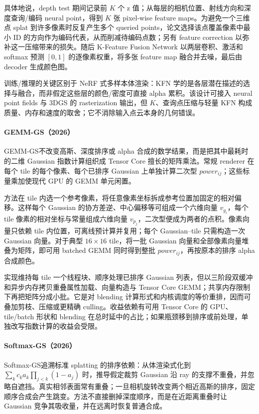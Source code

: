 具体地说，depth test 期间记录前 $K$ 个 z 值；从每层的相机位置、射线方向和深度查询/编码 neural point，得到 $K$ 张 pixel-wise feature maps。为避免一个三维点 splat 到许多像素时反复产生多个 queried points，论文选择该点覆盖像素中最小 ID 的方向作为编码代表，从而削减待编码点数；另有 feature correction 以弥补这一压缩带来的损失。随后 K-Feature Fusion Network 以两层卷积、激活和 softmax 预测 $[0,1]$ 的逐像素权重，将多张 feature map 融合并去噪，最后由 decoder 生成颜色图。

训练/推理的关键区别于 NeRF 式多样本体渲染：KFN 学的是各层潜在描述的选择与融合，而非假定这些层的颜色/密度可直接 alpha 累积。该设计可接入 neural point fields 与 3DGS 的 rasterization 输出，但 $K$、查询点压缩与轻量 KFN 构成质量、内存和速度的取舍；它不消除输入点云本身的几何错误。

\paragraph{GEMM-GS（2026）\cite{2604_02120}}
GEMM-GS不改变高斯、深度排序或 alpha 合成的数学结果，而是把其中最耗时的二维 Gaussian 指数计算组织成 Tensor Core 擅长的矩阵乘法。常规 renderer 在每个 tile 的每个像素、每个已排序 Gaussian 上单独计算二次型 $power_{ij}$；这些标量乘加使现代 GPU 的 GEMM 单元闲置。

方法在 tile 内选一个参考像素，将任意像素坐标拆成参考位置加固定的相对偏移。这样每个 Gaussian 的协方差逆、中心偏移等可组成一个六维向量 $v_{g_i}$，每个 tile 像素的相对坐标与常量组成六维向量 $v_{p_j}$，二次型便成为两者的点积。像素向量只依赖 tile 内位置，可离线预计算并复用；每个 Gaussian--tile 只需构造一次 Gaussian 向量。对于典型 $16\times16$ tile，将一批 Gaussian 向量和全部像素向量堆叠为矩阵，即可用 batched GEMM 同时得到整批 $power_{ij}$，再按原本的排序 alpha 合成颜色。

实现维持每 tile 一个线程块、顺序处理已排序 Gaussian 列表，但以三阶段双缓冲和异步内存拷贝重叠属性加载、向量构造与 Tensor Core GEMM；共享内存限制下再把矩阵分成小批。它是对 blending 计算形式和内核调度的等价重排，因而可叠加剪枝、压缩或更精确 culling。收益依赖有可用 Tensor Core 的 GPU、tile/batch 形状和 blending 在总时延中的占比；如果瓶颈移到排序或前处理，单独改写指数计算的收益会受限。

\paragraph{Softmax-GS（2026）\cite{2604_27437}}
Softmax-GS追溯标准 splatting 的排序依赖：从体渲染式化到 $\sum_k c_ka_k\prod_{j<k}(1-a_j)$ 时，推导假定裁剪 Gaussian 沿 ray 的支撑不重叠，并忽略自遮挡。真实相邻表面常有重叠；一旦相机旋转改变两个相近高斯的排序，固定顺序合成会产生跳变。方法不直接删掉深度顺序，而是在近距离重叠时让 Gaussian 竞争其吸收量，并在远离时恢复普通合成。

